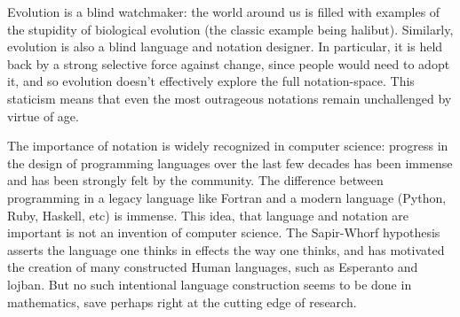 Evolution is a blind watchmaker: the world around us is filled with examples of the stupidity of biological evolution (the classic example being halibut). Similarly, evolution is also a blind language and notation designer. In particular, it is held back by a strong selective force against change, since people would need to adopt it, and so evolution doesn't effectively explore the full notation-space. This staticism means that even the most outrageous notations remain unchallenged by virtue of age.

% 

The importance of notation is widely recognized in computer science: progress in the design of programming languages over the last few decades has been immense and has been strongly felt by the community. The difference between programming in a legacy language like Fortran and a modern language (Python, Ruby, Haskell, etc) is immense. This idea, that language and notation are important is not an invention of computer science. The Sapir-Whorf hypothesis asserts the language one thinks in effects the way one thinks, and has motivated the creation of many constructed Human languages, such as Esperanto and lojban. But no such intentional language construction seems to be done in mathematics, save perhaps right at the cutting edge of research.

% 
% 
% 
% 
% 
% 

